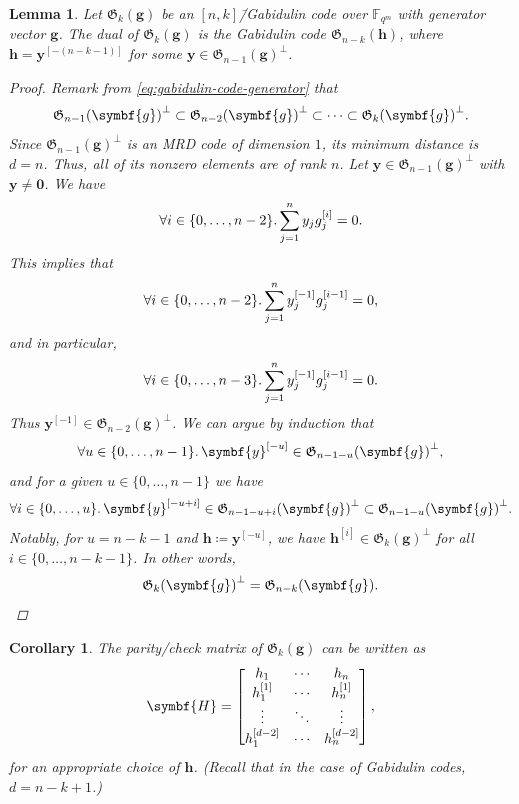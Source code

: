 \documentclass[version=last, paper=A4, parskip=half, oneside]{scrbook}
\theoremstyle{plain}
\newtheorem{lemma}{Lemma}
\newtheorem{corollary}{Corollary}
\theoremstyle{definition}
\theoremstyle{remark}
\renewcommand*{\vec}{\symbf}
\newcommand*{\mat}{\symbf}
\newcommand*{\FF}{\ensuremath{\mathbb{F}}}
\newcommand*{\Gab}{\ensuremath{\mathfrak{G}}}
\begin{document}
\begin{lemma}
  Let \(\Gab_k(\vec{g})\) be an \([n, k]\)\=/Gabidulin code over \(\FF_{q^m}\)
  with generator vector \(\vec{g}\).  The dual of \(\Gab_k(\vec{g})\) is the
  Gabidulin code \(\Gab_{n - k}(\vec{h})\), where
  \(\vec{h} = \vec{y}^{[-(n - k - 1)]}\) for some
  \(\vec{y} \in {\Gab_{n - 1}(\vec{g})}^{\perp}\).
  \begin{proof}
    Remark from \cref{eq:gabidulin-code-generator} that
    \[
      {\Gab_{n - 1}(\vec{g})}^{\perp} \subset
      {\Gab_{n - 2}(\vec{g})}^{\perp} \subset \cdots \subset
      {\Gab_{k}(\vec{g})}^{\perp}\text.
    \]
    Since \({\Gab_{n - 1}(\vec{g})}^{\perp}\) is an MRD code of dimension \(1\),
    its minimum distance is \(d = n\).  Thus, all of its nonzero elements are of
    rank \(n\).  Let \(\vec{y} \in {\Gab_{n - 1}(\vec{g})}^{\perp}\) with
    \(\vec{y} \ne \vec{0}\).  We have
    \[
      \forall i \in \{0, \ldots, n - 2\}\ldotp
      \sum_{j = 1}^n y_j g_j^{[i]} = 0\text.
    \]
    This implies that
    \[
      \forall i \in \{0, \ldots, n - 2\}\ldotp
      \sum_{j = 1}^n y_j^{[-1]} g_j^{[i - 1]} = 0\text,
    \]
    and in particular,
    \[
      \forall i \in \{0, \ldots, n - 3\}\ldotp
      \sum_{j = 1}^n y_j^{[-1]} g_j^{[i - 1]} = 0\text.
    \]
    Thus \(\vec{y}^{[-1]} \in {\Gab_{n - 2}(\vec{g})}^{\perp}\).  We can argue
    by induction that
    \[
      \forall u \in \{0, \ldots, n - 1\}\ldotp
      \vec{y}^{[-u]} \in {\Gab_{n - 1 - u}(\vec{g})}^{\perp}\text,
    \]
    and for a given \(u \in \{0, \ldots, n - 1\}\) we have
    \[
      \forall i \in \{0, \ldots, u\}\ldotp
      \vec{y}^{[-u + i]} \in {\Gab_{n - 1 - u + i}(\vec{g})}^{\perp} \subset
      {\Gab_{n - 1 - u}(\vec{g})}^{\perp}\text.
    \]
    Notably, for \(u = n - k - 1\) and \(\vec{h} \coloneqq \vec{y}^{[-u]}\), we
    have \(\vec{h}^{[i]} \in {\Gab_k(\vec{g})}^{\perp}\) for all
    \(i \in \{0, \ldots, n - k - 1\}\).  In other words,
    \[
      {\Gab_k(\vec{g})}^{\perp} = \Gab_{n - k}(\vec{g})\text.
    \]
  \end{proof}
\end{lemma}

\begin{corollary}
  The parity\-/check matrix of \(\Gab_k(\vec{g})\) can be written as
  \[
    \mat{H} =
    \begin{bmatrix}
      h_1 & \cdots & h_n \\
      h_1^{[1]} & \cdots & h_n^{[1]} \\
      \vdots & \ddots & \vdots \\
      h_1^{[d - 2]} & \cdots & h_n^{[d - 2]}
    \end{bmatrix}\text,
  \]
  for an appropriate choice of \(\vec{h}\).  (Recall that in the case of
  Gabidulin codes, \(d = n - k + 1\).)
\end{corollary}
\end{document}
